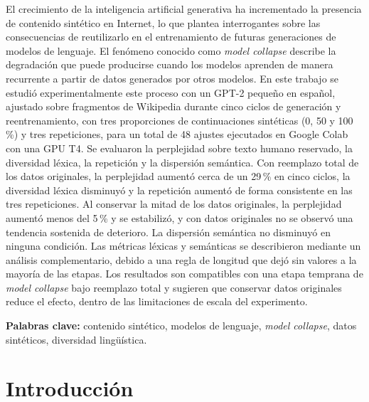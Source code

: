 \documentclass[12pt,letterpaper]{article}
\begin{document}
\vspace{0.5cm}

\justifying

El crecimiento de la inteligencia artificial generativa ha incrementado la
presencia de contenido sintético en Internet, lo que plantea interrogantes
sobre las consecuencias de reutilizarlo en el entrenamiento de futuras
generaciones de modelos de lenguaje. El fenómeno conocido como
\textit{model collapse} describe la degradación que puede producirse cuando
los modelos aprenden de manera recurrente a partir de datos generados por
otros modelos. En este trabajo se estudió experimentalmente este proceso con
un GPT-2 pequeño en español, ajustado sobre fragmentos de Wikipedia durante
cinco ciclos de generación y reentrenamiento, con tres proporciones de
continuaciones sintéticas (0, 50 y 100\,\%) y tres repeticiones, para un
total de 48 ajustes ejecutados en Google Colab con una GPU T4. Se evaluaron la
perplejidad sobre texto humano reservado, la diversidad léxica, la
repetición y la dispersión semántica. Con reemplazo total de los datos
originales, la perplejidad aumentó cerca de un 29\,\% en cinco ciclos, la
diversidad léxica disminuyó y la repetición aumentó de forma consistente en
las tres repeticiones. Al conservar la mitad de los datos originales, la
perplejidad aumentó menos del 5\,\% y se estabilizó, y con datos originales
no se observó una tendencia sostenida de deterioro. La dispersión semántica no disminuyó en ninguna
condición. Las métricas léxicas y semánticas se describieron mediante un
análisis complementario, debido a una regla de longitud que dejó sin valores
a la mayoría de las etapas. Los resultados son compatibles con una etapa
temprana de \textit{model collapse} bajo reemplazo total y sugieren que
conservar datos originales reduce el efecto, dentro de las limitaciones de
escala del experimento.

\vspace{0.7cm}

\noindent
\textbf{Palabras clave:}
contenido sintético,
modelos de lenguaje,
\textit{model collapse},
datos sintéticos,
diversidad lingüística.

\clearpage
{}
\setcounter{page}{1}
\section{Introducción}
\end{document}
